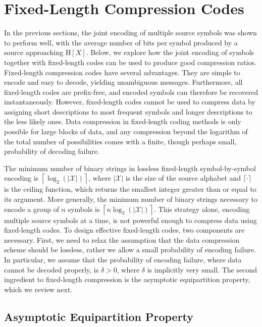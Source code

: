 \section{Fixed-Length Compression Codes}

In the previous sections, the joint encoding of multiple source symbols was shown to perform well, with the average number of bits per symbol produced by a source approaching $\mathrm{H}[X]$.
Below, we explore how the joint encoding of symbols together with fixed-length codes can be used to produce good compression ratios.
Fixed-length compression codes have several advantages.
They are simple to encode and easy to decode, yielding unambiguous messages.
Furthermore, all fixed-length codes are prefix-free, and encoded symbols can therefore be recovered instantaneously.
However, fixed-length codes cannot be used to compress data by assigning short descriptions to most frequent symbols and longer descriptions to the less likely ones.
Data compression in fixed-length coding methods is only possible for large blocks of data, and any compression beyond the logarithm of the total number of possibilities comes with a finite, though perhaps small, probability of decoding failure.

The minimum number of binary strings in lossless fixed-length symbol-by-symbol encoding is $\left\lceil \log_2 ( | \mathcal{X} | ) \right\rceil$, where $| \mathcal{X} |$ is the size of the source alphabet and $\lceil \cdot \rceil$ is the ceiling function, which returns the smallest integer greater than or equal to its argument.
More generally, the minimum number of binary strings necessary to encode a group of $n$ symbols is $\left\lceil n \log_2 ( | \mathcal{X} | ) \right\rceil$.
This strategy alone, encoding multiple source symbols at a time, is not powerful enough to compress data using fixed-length codes.
To design effective fixed-length codes, two components are necessary.
First, we need to relax the assumption that the data compression scheme should be lossless, rather we allow a small probability of encoding failure.
In particular, we assume that the probability of encoding failure, where data cannot be decoded properly, is $\delta > 0$, where $\delta$ is implicitly very small.
The second ingredient to fixed-length compression is the asymptotic equipartition property, which we review next.


\subsection{Asymptotic Equipartition Property}

